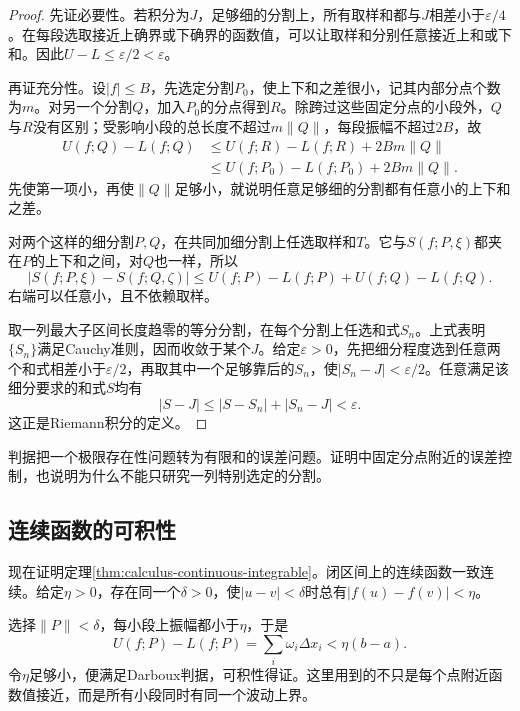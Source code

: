 \begin{proof}
先证必要性。若积分为\(J\)，足够细的分割上，所有取样和都与\(J\)相差小于\(\varepsilon/4\)。在每段选取接近上确界或下确界的函数值，可以让取样和分别任意接近上和或下和。因此\(U-L\le\varepsilon/2<\varepsilon\)。

再证充分性。设\(|f|\le B\)，先选定分割\(P_0\)，使上下和之差很小，记其内部分点个数为\(m\)。对另一个分割\(Q\)，加入\(P_0\)的分点得到\(R\)。除跨过这些固定分点的小段外，\(Q\)与\(R\)没有区别；受影响小段的总长度不超过\(m\|Q\|\)，每段振幅不超过\(2B\)，故
\begin{equation*}
 \begin{aligned}
 U(f;Q)-L(f;Q)&\le U(f;R)-L(f;R)+2Bm\|Q\|\\
 &\le U(f;P_0)-L(f;P_0)+2Bm\|Q\|.
 \end{aligned}
\end{equation*}
先使第一项小，再使\(\|Q\|\)足够小，就说明任意足够细的分割都有任意小的上下和之差。

对两个这样的细分割\(P,Q\)，在共同加细分割上任选取样和\(T\)。它与\(S(f;P,\xi)\)都夹在\(P\)的上下和之间，对\(Q\)也一样，所以
\begin{equation*}
 |S(f;P,\xi)-S(f;Q,\zeta)|
 \le U(f;P)-L(f;P)+U(f;Q)-L(f;Q).
\end{equation*}
右端可以任意小，且不依赖取样。

取一列最大子区间长度趋零的等分分割，在每个分割上任选和式\(S_n\)。上式表明\(\{S_n\}\)满足Cauchy准则，因而收敛于某个\(J\)。给定\(\varepsilon>0\)，先把细分程度选到任意两个和式相差小于\(\varepsilon/2\)，再取其中一个足够靠后的\(S_n\)，使\(|S_n-J|<\varepsilon/2\)。任意满足该细分要求的和式\(S\)均有
\begin{equation*}
 |S-J|\le|S-S_n|+|S_n-J|<\varepsilon.
\end{equation*}
这正是Riemann积分的定义。
\end{proof}

判据把一个极限存在性问题转为有限和的误差问题。证明中固定分点附近的误差控制，也说明为什么不能只研究一列特别选定的分割。
\endgroup

\subsection{连续函数的可积性}

现在证明定理\ref{thm:calculus-continuous-integrable}。闭区间上的连续函数一致连续。给定\(\eta>0\)，存在同一个\(\delta>0\)，使\(|u-v|<\delta\)时总有\(|f(u)-f(v)|<\eta\)。

选择\(\|P\|<\delta\)，每小段上振幅都小于\(\eta\)，于是
\begin{equation}\label{eq:calculus-upper-lower-gap}
 U(f;P)-L(f;P)=\sum_i\omega_i\Delta x_i<\eta(b-a).
\end{equation}
令\(\eta\)足够小，便满足Darboux判据，可积性得证。这里用到的不只是每个点附近函数值接近，而是所有小段同时有同一个波动上界。

